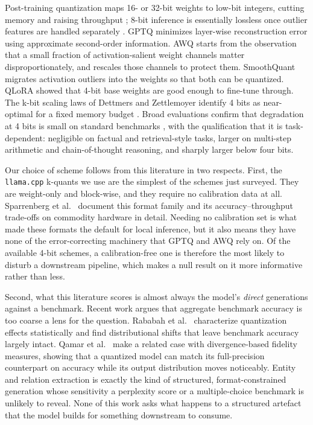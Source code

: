 \documentclass[conference, table]{IEEEtran}
\begin{document}
\noindent
Post-training quantization maps 16- or 32-bit weights to low-bit integers, cutting memory and raising throughput \cite{ptqsurvey2021}; 8-bit inference is essentially lossless once outlier features are handled separately \cite{dettmers2022}. GPTQ \cite{gptq2023} minimizes layer-wise reconstruction error using approximate second-order information. AWQ \cite{awq2024} starts from the observation that a small fraction of activation-salient weight channels matter disproportionately, and rescales those channels to protect them. SmoothQuant \cite{smoothquant2023} migrates activation outliers into the weights so that both can be quantized. QLoRA \cite{qlora2023} showed that 4-bit base weights are good enough to fine-tune through. The k-bit scaling laws of Dettmers and Zettlemoyer identify 4 bits as near-optimal for a fixed memory budget \cite{dettmers2023case}. Broad evaluations confirm that degradation at 4 bits is small on standard benchmarks \cite{quanteval2024}, with the qualification that it is task-dependent: negligible on factual and retrieval-style tasks, larger on multi-step arithmetic and chain-of-thought reasoning, and sharply larger below four bits.

\noindent
Our choice of scheme follows from this literature in two respects. First, the \texttt{llama.cpp} k-quants \cite{llamacpp,gguf} we use are the simplest of the schemes just surveyed. They are weight-only and block-wise, and they require no calibration data at all. Sparrenberg et al.\ \cite{sparrenberg2025llamacpp} document this format family and its accuracy--throughput trade-offs on commodity hardware in detail. Needing no calibration set is what made these formats the default for local inference, but it also means they have none of the error-correcting machinery that GPTQ and AWQ rely on. Of the available 4-bit schemes, a calibration-free one is therefore the most likely to disturb a downstream pipeline, which makes a null result on it more informative rather than less.

\noindent
Second, what this literature scores is almost always the model's \emph{direct} generations against a benchmark. Recent work argues that aggregate benchmark accuracy is too coarse a lens for the question. Rababah et al.\ \cite{rababah2026statistical} characterize quantization effects statistically and find distributional shifts that leave benchmark accuracy largely intact. Qamar et al.\ \cite{qamar2026divergence} make a related case with divergence-based fidelity measures, showing that a quantized model can match its full-precision counterpart on accuracy while its output distribution moves noticeably. Entity and relation extraction is exactly the kind of structured, format-constrained generation whose sensitivity a perplexity score or a multiple-choice benchmark is unlikely to reveal. None of this work asks what happens to a structured artefact that the model builds for something downstream to consume.
\end{document}

